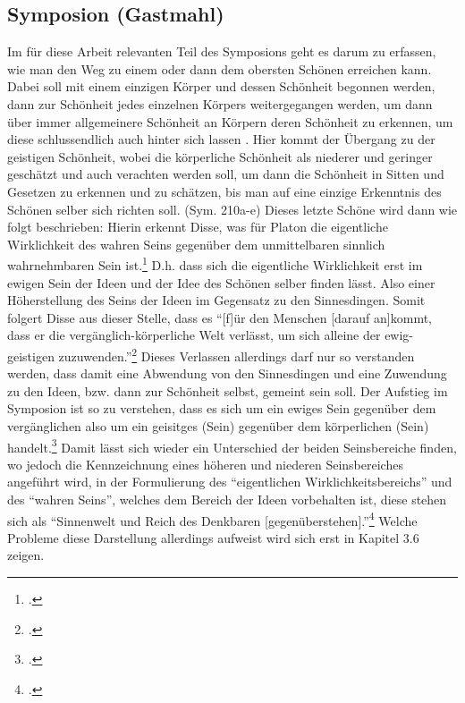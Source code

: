 \subsection{Symposion (Gastmahl)}
Im für diese Arbeit relevanten Teil des Symposions geht es darum zu erfassen, wie man den Weg zu einem oder dann dem obersten Schönen erreichen kann. Dabei soll mit einem einzigen Körper und dessen Schönheit begonnen werden, dann zur Schönheit jedes einzelnen Körpers weitergegangen werden, um dann über immer allgemeinere Schönheit an Körpern deren Schönheit zu erkennen, um diese schlussendlich auch hinter sich lassen . Hier kommt der Übergang zu der geistigen Schönheit, wobei die körperliche Schönheit als niederer und geringer geschätzt und auch verachten werden soll, um dann die Schönheit in Sitten und Gesetzen zu erkennen und zu schätzen, bis man auf eine einzige Erkenntnis des Schönen selber sich richten soll. (Sym. 210a-e)  
Dieses letzte Schöne wird dann wie folgt beschrieben: 
Hierin erkennt Disse, was für Platon die eigentliche Wirklichkeit des wahren Seins gegenüber dem unmittelbaren sinnlich wahrnehmbaren Sein ist.\footcite[vgl.][S. 27]{DisseMetaphysik} D.h. dass sich die eigentliche Wirklichkeit erst im ewigen Sein der Ideen und der Idee des Schönen selber finden lässt. Also einer Höherstellung des Seins der Ideen im Gegensatz zu den Sinnesdingen. Somit folgert Disse aus dieser Stelle, dass es \enquote{[f]ür den Menschen [darauf an]kommt, dass er die vergänglich-körperliche Welt verlässt, um sich alleine der ewig-geistigen zuzuwenden.}\footcite[vgl.][S. 28]{DisseMetaphysik} Dieses Verlassen allerdings darf nur so verstanden werden, dass damit eine Abwendung von den Sinnesdingen und eine Zuwendung zu den Ideen, bzw. dann zur Schönheit selbst, gemeint sein soll. 
Der Aufstieg im Symposion ist so zu verstehen, dass es sich um ein ewiges Sein gegenüber dem vergänglichen also um ein geisitges (Sein) gegenüber dem körperlichen (Sein) handelt.\footcite[vgl.][S. 27f.]{DisseMetaphysik}
Damit lässt sich wieder ein Unterschied der beiden Seinsbereiche finden, wo jedoch die Kennzeichnung eines höheren und niederen Seinsbereiches angeführt wird, in der Formulierung des \enquote{eigentlichen Wirklichkeitsbereichs} und des \enquote{wahren Seins}, welches dem Bereich der Ideen vorbehalten ist, diese stehen sich als \enquote{Sinnenwelt und Reich des Denkbaren [gegenüberstehen].}\footcite[vgl.][S. 28]{DisseMetaphysik} Welche Probleme diese Darstellung allerdings aufweist wird sich erst in Kapitel 3.6 zeigen.
